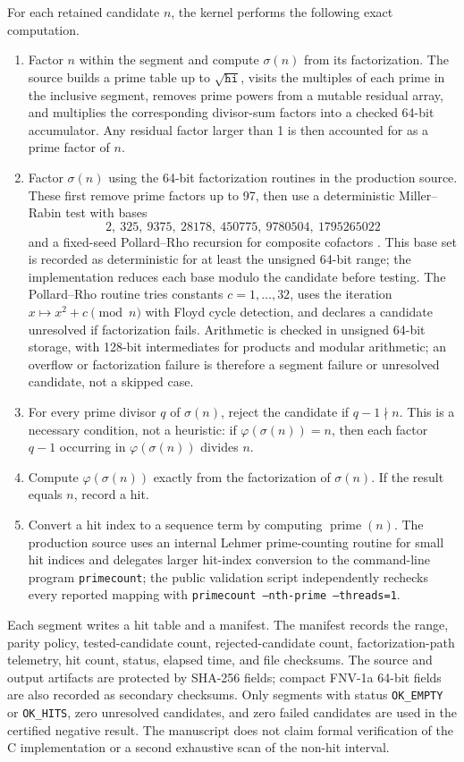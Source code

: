 \documentclass[11pt]{article}
\theoremstyle{definition}
\theoremstyle{remark}
\begin{document}
For each retained candidate \(n\), the kernel performs the following
exact computation.
\begin{enumerate}
\item Factor \(n\) within the segment and compute \(\sigma(n)\) from its
factorization.  The source builds a prime table up to \(\sqrt{\texttt{hi}}\),
visits the multiples of each prime in the inclusive segment, removes
prime powers from a mutable residual array, and multiplies the
corresponding divisor-sum factors into a checked 64-bit accumulator.
Any residual factor larger than 1 is then accounted for as a prime
factor of \(n\).
\item Factor \(\sigma(n)\) using the 64-bit factorization routines in the
production source.  These first remove prime factors up to 97, then use a
deterministic Miller--Rabin test with bases
\[
2,\ 325,\ 9375,\ 28178,\ 450775,\ 9780504,\ 1795265022
\]
and a fixed-seed Pollard--Rho recursion for composite cofactors
\cite{miller1976,rabin1980,sprpBases,pollard1975}.  This base set is
recorded as deterministic for at least the unsigned 64-bit range; the
implementation reduces each base modulo the candidate before testing.
The
Pollard--Rho routine tries constants \(c=1,\ldots,32\), uses the
iteration \(x\mapsto x^2+c\pmod n\) with Floyd cycle detection, and
declares a candidate unresolved if factorization fails.  Arithmetic is
checked in unsigned 64-bit storage, with 128-bit intermediates for
products and modular arithmetic; an overflow or factorization failure is
therefore a segment failure or unresolved candidate, not a skipped case.
\item For every prime divisor \(q\) of \(\sigma(n)\), reject the candidate
if \(q-1\nmid n\).  This is a necessary condition, not a heuristic:
if \(\varphi(\sigma(n))=n\), then each factor \(q-1\) occurring in
\(\varphi(\sigma(n))\) divides \(n\).
\item Compute \(\varphi(\sigma(n))\) exactly from the factorization of
\(\sigma(n)\).  If the result equals \(n\), record a hit.
\item Convert a hit index to a sequence term by computing
\(\operatorname{prime}(n)\).  The production source uses an internal
Lehmer prime-counting routine for small hit indices and delegates larger
hit-index conversion to the command-line program \texttt{primecount};
the public validation script independently rechecks every reported
mapping with \texttt{primecount --nth-prime --threads=1}.
\end{enumerate}

Each segment writes a hit table and a manifest.  The manifest records the
range, parity policy, tested-candidate count, rejected-candidate count,
factorization-path telemetry, hit count, status, elapsed time, and file
checksums.  The source and output artifacts are protected by SHA-256
fields; compact FNV-1a 64-bit fields are also recorded as secondary
checksums.  Only segments with status \texttt{OK\_EMPTY} or
\texttt{OK\_HITS}, zero unresolved candidates, and zero failed candidates
are used in the certified negative result.  The manuscript does not claim
formal verification of the C implementation or a second exhaustive scan
of the non-hit interval.
\end{document}
